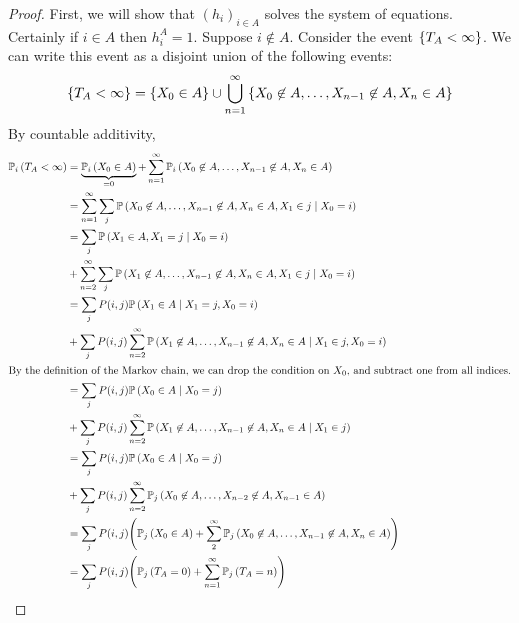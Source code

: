 \begin{proof}
	First, we will show that \( (h_i)_{i \in A} \) solves the system of equations.
	Certainly if \( i \in A \) then \( h_i^A = 1 \).
	Suppose \( i \not\in A \).
	Consider the event \( \qty{T_A < \infty} \).
	We can write this event as a disjoint union of the following events:
	\[
		\qty{T_A < \infty} = \qty{X_0 \in A} \cup \bigcup_{n=1}^\infty \qty{X_0 \not\in A, \dots, X_{n-1} \not\in A, X_n \in A}
	\]
	By countable additivity,
	\begin{align*}
		\psub{i}{T_A < \infty} & = \underbrace{\psub{i}{X_0 \in A}}_{=0} + \sum_{n=1}^\infty \psub{i}{X_0 \not\in A, \dots, X_{n-1} \not\in A, X_n \in A}                               \\
		 & = \sum_{n=1}^\infty \sum_j \prob{X_0 \not\in A, \dots, X_{n-1} \not\in A, X_n \in A, X_1 \in j \mid X_0 = i}                                                               \\
		 & = \sum_j \prob{X_1 \in A, X_1 = j \mid X_0 = i} \\
		 & + \sum_{n=2}^\infty \sum_j \prob{X_1 \not\in A, \dots, X_{n-1} \not\in A, X_n \in A, X_1 \in j \mid X_0 = i}               \\
		 & = \sum_j P(i,j) \prob{X_1 \in A \mid X_1 = j, X_0 = i} \\
		 & + \sum_j P(i,j) \sum_{n=2}^\infty \prob{X_1 \not\in A, \dots, X_{n-1} \not\in A, X_n \in A \mid X_1 \in j, X_0 = i} \\
		\intertext{By the definition of the Markov chain, we can drop the condition on \( X_0 \), and subtract one from all indices.}
		 & = \sum_j P(i,j) \prob{X_0 \in A \mid X_0 = j} \\
		 & + \sum_j P(i,j) \sum_{n=2}^\infty \prob{X_1 \not\in A, \dots, X_{n-1} \not\in A, X_n \in A \mid X_1 \in j}                   \\
		 & = \sum_j P(i,j) \prob{X_0 \in A \mid X_0 = j} \\
		 & + \sum_j P(i,j) \sum_{n=2}^\infty \psub{j}{X_0 \not\in A, \dots, X_{n-2} \not\in A, X_{n-1} \in A}                           \\
		 & = \sum_j P(i,j) \qty( \psub{j}{X_0 \in A} + \sum_{2}^\infty \psub{j}{X_0 \not\in A, \dots, X_{n-1} \not\in A, X_n \in A} )                                                 \\
		 & = \sum_j P(i,j) \qty( \psub{j}{T_A = 0} + \sum_{n=1}^\infty \psub{j}{T_A = n} )                                                                                            \\

\end{align*}
\end{proof}
